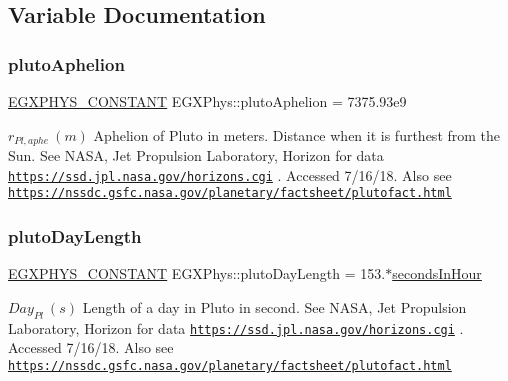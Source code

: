 \subsection{Variable Documentation}
\mbox{\label{group___e_g_x_phys-_constants-_astrophysics-_solar_system-_pluto-_orbit_ga71041e3e77c8f24560491b0028548d54}} 
\subsubsection{\texorpdfstring{pluto\+Aphelion}{plutoAphelion}}
{\footnotesize\ttfamily \mbox{\hyperlink{group___e_g_x_phys-_constants-_macros_ga76980d288494ce1714c9ac68a95ba702}{E\+G\+X\+P\+H\+Y\+S\+\_\+\+C\+O\+N\+S\+T\+A\+NT}} E\+G\+X\+Phys\+::pluto\+Aphelion = 7375.\+93e9}

$ r_{Pl,aphe} \ (m)$ Aphelion of Pluto in meters. Distance when it is furthest from the Sun. See N\+A\+SA, Jet Propulsion Laboratory, Horizon for data \href{https://ssd.jpl.nasa.gov/horizons.cgi}{\tt https\+://ssd.\+jpl.\+nasa.\+gov/horizons.\+cgi} . Accessed 7/16/18. Also see \href{https://nssdc.gsfc.nasa.gov/planetary/factsheet/plutofact.html}{\tt https\+://nssdc.\+gsfc.\+nasa.\+gov/planetary/factsheet/plutofact.\+html} \mbox{\label{group___e_g_x_phys-_constants-_astrophysics-_solar_system-_pluto-_orbit_gabb53431474dd4d2fc98116f18052cf51}} 
\subsubsection{\texorpdfstring{pluto\+Day\+Length}{plutoDayLength}}
{\footnotesize\ttfamily \mbox{\hyperlink{group___e_g_x_phys-_constants-_macros_ga76980d288494ce1714c9ac68a95ba702}{E\+G\+X\+P\+H\+Y\+S\+\_\+\+C\+O\+N\+S\+T\+A\+NT}} E\+G\+X\+Phys\+::pluto\+Day\+Length = 153.$\ast$\mbox{\hyperlink{namespace_e_g_x_phys_a7c3165cd93e36f1fb8e9fef80f117bef}{seconds\+In\+Hour}}}

$ Day_{Pl} \ (s)$ Length of a day in Pluto in second. See N\+A\+SA, Jet Propulsion Laboratory, Horizon for data \href{https://ssd.jpl.nasa.gov/horizons.cgi}{\tt https\+://ssd.\+jpl.\+nasa.\+gov/horizons.\+cgi} . Accessed 7/16/18. Also see \href{https://nssdc.gsfc.nasa.gov/planetary/factsheet/plutofact.html}{\tt https\+://nssdc.\+gsfc.\+nasa.\+gov/planetary/factsheet/plutofact.\+html} \mbox{\label{group___e_g_x_phys-_constants-_astrophysics-_solar_system-_pluto-_orbit_ga2d8172ce3f1ca01e0db019dfde383a08}} 
